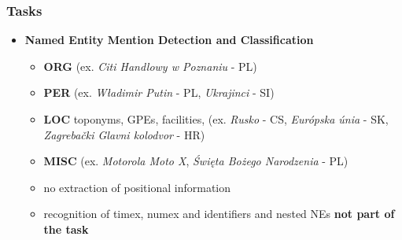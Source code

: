 \documentclass{beamer}
\begin{document}
\begin{frame}
 \frametitle{Tasks}

\begin{itemize}

\item \textbf{Named Entity Mention Detection and Classification}

\begin{itemize}

\item \textbf{ORG} (ex. {\color{blue}\textit{Citi Handlowy w Poznaniu}} - PL)

\vspace{0.2cm}

\item \textbf{PER} (ex. {\color{blue}\textit{Władimir Putin}} - PL, {\color{blue}\textit{Ukrajinci}} - SI)

\vspace{0.2cm}

\item \textbf{LOC} toponyms, GPEs, facilities, (ex. {\color{blue}\textit{Rusko}} - CS, {\color{blue}\textit{Európska únia}} - SK, {\color{blue}\textit{Zagrebački Glavni kolodvor}} - HR)

\vspace{0.2cm}

\item \textbf{MISC} (ex. {\color{blue}\textit{Motorola Moto X}}, {\color{blue}\textit{Święta Bożego Narodzenia}} - PL)

\vspace{0.2cm}

\item no extraction of positional information

\vspace{0.2cm}

\item recognition of timex, numex and identifiers and nested NEs \textbf{not part of the task}

\end{itemize}

\end{itemize}

\end{frame}
\end{document}
